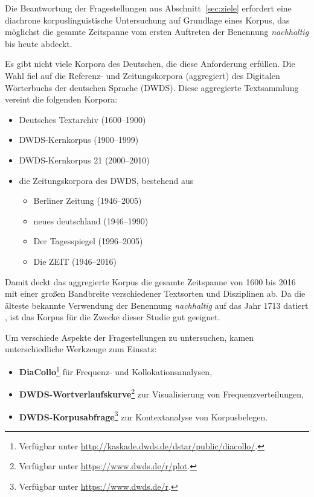 \documentclass[
    german,
    a4paper,%
    12pt,%
    oneside,%
    toc=bibliography,
    final,
]{scrartcl}
\begin{document}
Die Beantwortung der Fragestellungen aus Abschnitt~\ref{sec:ziele} erfordert eine diachrone korpuslinguistische Untersuchung auf Grundlage eines Korpus, das möglichst die gesamte Zeitspanne vom ersten Auftreten der Benennung \textit{nachhaltig} bis heute abdeckt.

Es gibt nicht viele Korpora des Deutschen, die diese Anforderung erfüllen. Die Wahl fiel auf die Referenz- und Zeitungskorpora (aggregiert) des Digitalen Wörterbuchs der deutschen Sprache (DWDS). Diese aggregierte Textsammlung vereint die folgenden Korpora:

\begin{itemize}
\item Deutsches Textarchiv (1600–1900) \citep[vgl.][]{Geyken2011}
\item DWDS-Kernkorpus (1900–1999) \citep[vgl.][]{Geyken2007}
\item DWDS-Kernkorpus 21 (2000–2010) \citep[vgl.][]{Geyken2007}
\item die Zeitungskorpora des DWDS, bestehend aus
	\begin{itemize}
	\item Berliner Zeitung (1946–2005)
	\item neues deutschland (1946–1990)
	\item Der Tagesspiegel (1996–2005)
	\item Die ZEIT (1946–2016)
	\end{itemize}
\end{itemize}

Damit deckt das aggregierte Korpus die gesamte Zeitspanne von 1600 bis 2016 mit einer großen Bandbreite verschiedener Textsorten und Disziplinen ab. Da die älteste bekannte Verwendung der Benennung \textit{nachhaltig} auf das Jahr 1713 datiert \citep[vgl.][99]{Zürcher1965}, ist das Korpus für die Zwecke dieser Studie gut geeignet.

Um verschiede Aspekte der Fragestellungen zu untersuchen, kamen unterschiedliche Werkzeuge zum Einsatz:

\begin{itemize}
\item \textbf{DiaCollo}\footnote{Verfügbar unter \url{http://kaskade.dwds.de/dstar/public/diacollo/}.} \citep{Jurish2015} für Frequenz- und Kollokationsanalysen,
\item \textbf{DWDS-Wortverlaufskurve}\footnote{Verfügbar unter \url{https://www.dwds.de/r/plot}.} zur Visualisierung von Frequenzverteilungen,
\item \textbf{DWDS-Korpusabfrage}\footnote{Verfügbar unter \url{https://www.dwds.de/r}.} zur Kontextanalyse von Korpusbelegen.
\end{itemize}
\end{document}
